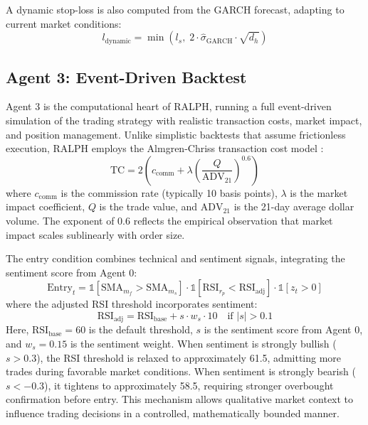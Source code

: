 \documentclass[conference]{IEEEtran}
\begin{document}
A dynamic stop-loss is also computed from the GARCH forecast, adapting to current market conditions:
\begin{equation}
    l_{\text{dynamic}} = \min\left(l_s, \; 2 \cdot \hat{\sigma}_{\text{GARCH}} \cdot \sqrt{d_h}\right)
\end{equation}

\subsection{Agent 3: Event-Driven Backtest}
\label{sec:agent3}

Agent 3 is the computational heart of RALPH, running a full event-driven simulation of the trading strategy with realistic transaction costs, market impact, and position management. Unlike simplistic backtests that assume frictionless execution, RALPH employs the Almgren-Chriss transaction cost model \cite{almgren2001optimal}:
\begin{equation}
    \text{TC} = 2 \left(c_{\text{comm}} + \lambda \left(\frac{Q}{\text{ADV}_{21}}\right)^{0.6}\right)
    \label{eq:tc}
\end{equation}
where $c_{\text{comm}}$ is the commission rate (typically 10 basis points), $\lambda$ is the market impact coefficient, $Q$ is the trade value, and $\text{ADV}_{21}$ is the 21-day average dollar volume. The exponent of 0.6 reflects the empirical observation that market impact scales sublinearly with order size.

The entry condition combines technical and sentiment signals, integrating the sentiment score from Agent 0:
\begin{equation}
    \text{Entry}_t = \mathbb{1}[\text{SMA}_{m_f} > \text{SMA}_{m_s}] \cdot \mathbb{1}[\text{RSI}_{r_p} < \text{RSI}_{\text{adj}}] \cdot \mathbb{1}[z_t > 0]
    \label{eq:entry}
\end{equation}
where the adjusted RSI threshold incorporates sentiment:
\begin{equation}
    \text{RSI}_{\text{adj}} = \text{RSI}_{\text{base}} + s \cdot w_s \cdot 10 \quad \text{if } |s| > 0.1
\end{equation}
Here, $\text{RSI}_{\text{base}} = 60$ is the default threshold, $s$ is the sentiment score from Agent 0, and $w_s = 0.15$ is the sentiment weight. When sentiment is strongly bullish ($s > 0.3$), the RSI threshold is relaxed to approximately 61.5, admitting more trades during favorable market conditions. When sentiment is strongly bearish ($s < -0.3$), it tightens to approximately 58.5, requiring stronger overbought confirmation before entry. This mechanism allows qualitative market context to influence trading decisions in a controlled, mathematically bounded manner.
\end{document}
